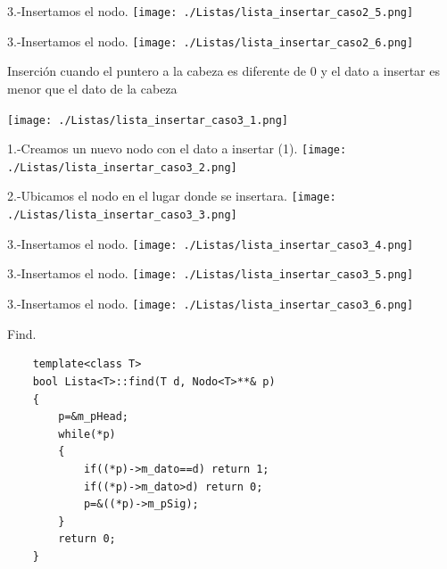 \documentclass{beamer}
\begin{document}
\begin{frame}
  3.-Insertamos el nodo.
  \texttt{[image: ./Listas/lista\_insertar\_caso2\_5.png]}  
   
  
\end{frame}

\begin{frame}
  3.-Insertamos el nodo.
  \texttt{[image: ./Listas/lista\_insertar\_caso2\_6.png]}  
   
  
\end{frame}

\begin{frame}
  Inserción cuando el puntero a la cabeza es diferente de  0 y el dato a insertar es menor que el dato de la cabeza
  
  \texttt{[image: ./Listas/lista\_insertar\_caso3\_1.png]}
  
\end{frame}

\begin{frame}
  1.-Creamos un nuevo nodo con el dato a insertar (1).
  \texttt{[image: ./Listas/lista\_insertar\_caso3\_2.png]}
  
\end{frame}

\begin{frame}
  2.-Ubicamos el nodo en el lugar donde se insertara.
  \texttt{[image: ./Listas/lista\_insertar\_caso3\_3.png]}
  
\end{frame}

\begin{frame}
  3.-Insertamos el nodo.
  \texttt{[image: ./Listas/lista\_insertar\_caso3\_4.png]}  
   
  
\end{frame}

\begin{frame}
  3.-Insertamos el nodo.
  \texttt{[image: ./Listas/lista\_insertar\_caso3\_5.png]}  
   
  
\end{frame}

\begin{frame}
  3.-Insertamos el nodo.
  \texttt{[image: ./Listas/lista\_insertar\_caso3\_6.png]}  
   
  
\end{frame}

\begin{frame}[fragile] 
  Find.
  \begin{verbatim}
    template<class T>
    bool Lista<T>::find(T d, Nodo<T>**& p)
    {
        p=&m_pHead;
        while(*p)
        {
            if((*p)->m_dato==d) return 1;
            if((*p)->m_dato>d) return 0;
            p=&((*p)->m_pSig);
        }
        return 0;
    }
  \end{verbatim}
\end{frame}
\end{document}
